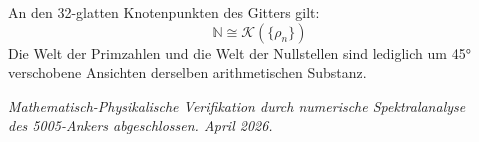 \documentclass[12pt,a4paper]{article}
\begin{document}
	\vspace{1.5cm}
	
	\begin{center}
		\begin{tcolorbox}[colback=yellow!10,colframe=orange!80!black,width=0.8\textwidth,center title,title=Das Theorem der exakten Deckung]
			An den 32-glatten Knotenpunkten des Gitters gilt:
			\begin{equation*}
				\mathbb{N} \cong \mathcal{K}(\{\rho_n\})
			\end{equation*}
			Die Welt der Primzahlen und die Welt der Nullstellen sind lediglich um 45° verschobene Ansichten derselben arithmetischen Substanz.
		\end{tcolorbox}
	\end{center}
	
	\vfill
	
	\begin{center}
		\small \textit{Mathematisch-Physikalische Verifikation durch numerische Spektralanalyse} \\
		\textit{des 5005-Ankers abgeschlossen. April 2026.}
	\end{center}
	
\end{document}
